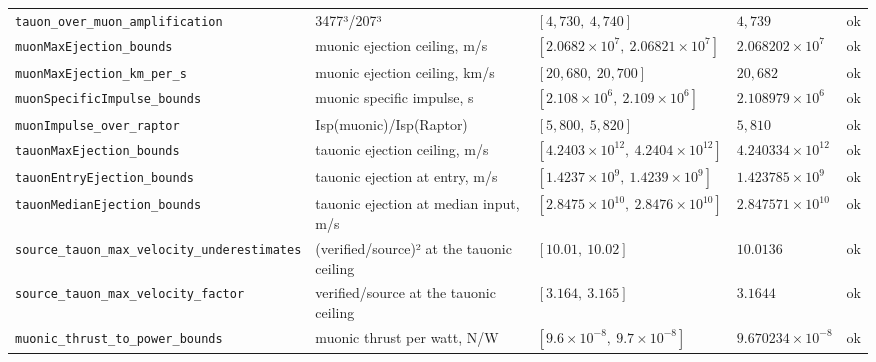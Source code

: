 \documentclass[11pt,a4paper]{article}
\begin{document}
{\begin{longtable}{@{}p{}p{}p{}p{}p{}@{}}
\texttt{\scriptsize tauon\_\allowbreak{}over\_\allowbreak{}muon\_\allowbreak{}amplification} & 3477³/207³ & $[4{,}730,\ 4{,}740]$ & $4{,}739$ & \textcolor{okgreen}{ok} \\
\texttt{\scriptsize muonMaxEjection\_\allowbreak{}bounds} & muonic ejection ceiling, m/s & $[2.0682 \times 10^{7},\ 2.06821 \times 10^{7}]$ & $2.068202 \times 10^{7}$ & \textcolor{okgreen}{ok} \\
\texttt{\scriptsize muonMaxEjection\_\allowbreak{}km\_\allowbreak{}per\_\allowbreak{}s} & muonic ejection ceiling, km/s & $[20{,}680,\ 20{,}700]$ & $20{,}682$ & \textcolor{okgreen}{ok} \\
\texttt{\scriptsize muonSpecificImpulse\_\allowbreak{}bounds} & muonic specific impulse, s & $[2.108 \times 10^{6},\ 2.109 \times 10^{6}]$ & $2.108979 \times 10^{6}$ & \textcolor{okgreen}{ok} \\
\texttt{\scriptsize muonImpulse\_\allowbreak{}over\_\allowbreak{}raptor} & Isp(muonic)/Isp(Raptor) & $[5{,}800,\ 5{,}820]$ & $5{,}810$ & \textcolor{okgreen}{ok} \\
\texttt{\scriptsize tauonMaxEjection\_\allowbreak{}bounds} & tauonic ejection ceiling, m/s & $[4.2403 \times 10^{12},\ 4.2404 \times 10^{12}]$ & $4.240334 \times 10^{12}$ & \textcolor{okgreen}{ok} \\
\texttt{\scriptsize tauonEntryEjection\_\allowbreak{}bounds} & tauonic ejection at entry, m/s & $[1.4237 \times 10^{9},\ 1.4239 \times 10^{9}]$ & $1.423785 \times 10^{9}$ & \textcolor{okgreen}{ok} \\
\texttt{\scriptsize tauonMedianEjection\_\allowbreak{}bounds} & tauonic ejection at median input, m/s & $[2.8475 \times 10^{10},\ 2.8476 \times 10^{10}]$ & $2.847571 \times 10^{10}$ & \textcolor{okgreen}{ok} \\
\texttt{\scriptsize source\_\allowbreak{}tauon\_\allowbreak{}max\_\allowbreak{}velocity\_\allowbreak{}underestimates} & (verified/source)² at the tauonic ceiling & $[10.01,\ 10.02]$ & $10.0136$ & \textcolor{okgreen}{ok} \\
\texttt{\scriptsize source\_\allowbreak{}tauon\_\allowbreak{}max\_\allowbreak{}velocity\_\allowbreak{}factor} & verified/source at the tauonic ceiling & $[3.164,\ 3.165]$ & $3.1644$ & \textcolor{okgreen}{ok} \\
\texttt{\scriptsize muonic\_\allowbreak{}thrust\_\allowbreak{}to\_\allowbreak{}power\_\allowbreak{}bounds} & muonic thrust per watt, N/W & $[9.6 \times 10^{-8},\ 9.7 \times 10^{-8}]$ & $9.670234 \times 10^{-8}$ & \textcolor{okgreen}{ok} \\

\end{longtable}}
\end{document}
